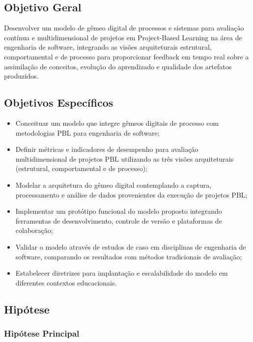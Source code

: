 \documentclass[12pt, a4paper, oneside, brazilian]{abntex2}
\begin{document}
\subsection{Objetivo Geral}

Desenvolver um modelo de gêmeo digital de processos e sistemas para avaliação contínua e multidimensional de projetos em Project-Based Learning na área de engenharia de software, integrando as visões arquiteturais estrutural, comportamental e de processo para proporcionar feedback em tempo real sobre a assimilação de conceitos, evolução do aprendizado e qualidade dos artefatos produzidos.

\subsection{Objetivos Específicos}

\begin{itemize}
\item Conceituar um modelo que integre gêmeos digitais de processo com metodologias PBL para engenharia de software;
\item Definir métricas e indicadores de desempenho para avaliação multidimensional de projetos PBL utilizando as três visões arquiteturais (estrutural, comportamental e de processo);
\item Modelar a arquitetura do gêmeo digital contemplando a captura, processamento e análise de dados provenientes da execução de projetos PBL;
\item Implementar um protótipo funcional do modelo proposto integrando ferramentas de desenvolvimento, controle de versão e plataformas de colaboração;
\item Validar o modelo através de estudos de caso em disciplinas de engenharia de software, comparando os resultados com métodos tradicionais de avaliação;
\item Estabelecer diretrizes para implantação e escalabilidade do modelo em diferentes contextos educacionais.
\end{itemize}

\subsection{Hipótese}

\subsubsection{Hipótese Principal}
\end{document}
